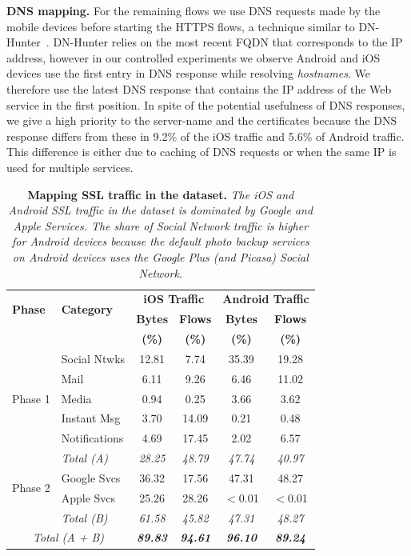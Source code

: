 \noindent\textbf{DNS mapping.} 
For the remaining flows we use DNS requests made by the mobile devices before starting the HTTPS flows, a technique similar to DN-Hunter~\cite{bermudez:dnhunter}.
DN-Hunter relies on the most recent FQDN that corresponds to the IP address, however in our controlled experiments we observe Android and iOS devices use the first entry in DNS response while resolving \emph{hostnames}.
We therefore use the latest DNS response that contains the IP address of the Web service in the first position.
In spite of the potential usefulness of DNS responses, we give a high priority to the server-name and the certificates because the DNS response differs from these in 9.2\% of the iOS traffic and 5.6\% of Android traffic.
This difference is either due to caching of DNS requests or when the same IP is used for multiple services. 

\begin{table}
\centering
\begin{small}
\begin{tabular}{|p{}|p{}|c|c|c|c|}
\hline
\multirow{2}{*}{\bf Phase} & \multirow{2}{*}{\bf Category} & \multicolumn{2}{c|}{\bf iOS Traffic} &  \multicolumn{2}{c|}{\bf Android Traffic} \tabularnewline
\cline{3-6}
 &         & {\bf Bytes}  & {\bf Flows} & {\bf Bytes} & {\bf Flows}   \tabularnewline
 &         & {\bf (\%)}  & {\bf (\%)} & {\bf (\%)} & {\bf (\%)}   \tabularnewline
\hline
\multirow{5}{*}{Phase 1}
& Social Ntwks    & 12.81 &  7.74 & 35.39 & 19.28 \tabularnewline
\cline{2-6}
& Mail               &  6.11 &  9.26 &  6.46 & 11.02 \tabularnewline
\cline{2-6}
& Media              &  0.94 &  0.25 &  3.66 &  3.62 \tabularnewline
\cline{2-6}
& Instant Msg   &  3.70 & 14.09 &  0.21 &  0.48 \tabularnewline
\cline{2-6}
& Notifications     &  4.69 & 17.45 &  2.02 &  6.57 \tabularnewline
\cline{2-6}
& \emph{Total (A) }       & {\em 28.25} & {\em 48.79} & {\em 47.74} & {\em 40.97} \tabularnewline
\hline
\multirow{2}{*}{Phase 2}
 & Google Svcs   & 36.32 & 17.56 & 47.31 & 48.27 \tabularnewline
\cline{2-6}
 & Apple Svcs    & 25.26 & 28.26 & $<$0.01 & $<$0.01 \tabularnewline
\cline{2-6}
\cline{2-6}
& \emph{Total (B) }       & {\em 61.58} & {\em 45.82} & {\em 47.31} & {\em 48.27} \tabularnewline
\hline
\multicolumn{2}{|c|}{\emph{Total (A + B)}}       & {\em \bf 89.83} & {\em\bf 94.61} & {\em\bf  96.10}  &  {\em\bf  89.24} \tabularnewline
\hline
\end{tabular}
\end{small}
\caption{\textbf{Mapping SSL traffic in the \mobWild dataset.} \emph{The iOS and Android SSL traffic in the \mobWild dataset is dominated by Google and Apple Services. The share of Social Network traffic is higher for Android devices because the default photo backup services on Android devices uses the Google Plus (and Picasa) Social Network.}}
\label{tab:classify-ssl-traffic}
\end{table}

